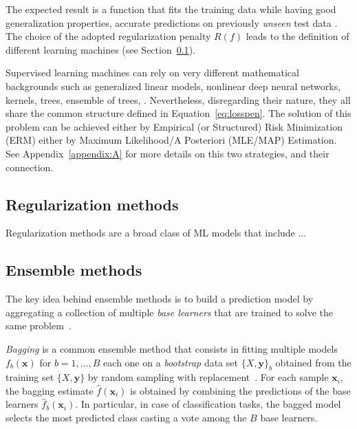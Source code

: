     The expected result is a function that fits the training data while having good generalization properties, \ie accurate predictions on previously  \textit{unseen} test data \cite{hastie2009elements}. The choice of the adopted regularization penalty $R(f)$ leads to the definition of different learning machines (see Section~\ref{subsec:regularization_methods}).



    Supervised learning machines can rely on very different mathematical backgrounds such as generalized linear models, nonlinear deep neural networks, kernels, trees, ensemble of trees, \etc. Nevertheless, disregarding their nature, they all share the common structure defined in Equation~\eqref{eq:losspen}.
    The solution of this problem can be achieved either by Empirical (or Structured) Risk Minimization (\ac{ERM}) either by Maximum Likelihood/A Posteriori (\ac{MLE}/\ac{MAP}) Estimation. See Appendix~\ref{appendix:A} for more details on this two strategies, and their connection.

    \subsection{Regularization methods} \label{subsec:regularization_methods}
    Regularization methods are a broad class of ML models that include ...

    \subsection{Ensemble methods}

    The key idea behind ensemble methods is to build a prediction model by aggregating a collection of multiple \textit{base learners} that are trained to solve the same problem~\citep{zhou2012ensemble}.

    \textit{Bagging} is a common ensemble method that consists in fitting multiple models $f_b(\bm{x})$ for $b=1,\dots,B$ each one on a \textit{bootstrap} data set $\{X,\bm{y}\}_b$ obtained from the training set $\{X,\bm{y}\}$ by random sampling with replacement~\citep{hastie2009elements}. For each sample $\bm{x}_i$, the bagging estimate $\hat{f}(\bm{x}_i)$ is obtained by combining the predictions of the base learners $\hat{f}_b(\bm{x}_i)$. In particular, in case of classification tasks, the bagged model selects the most predicted class casting a vote among the $B$ base learners.

